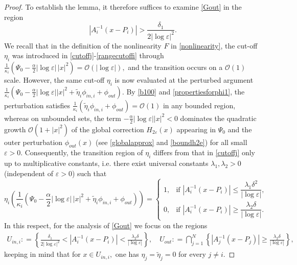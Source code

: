 \documentclass[11pt,reqno,a4paper]{amsart}
\numberwithin{equation}{section}
\newcommand{\defeq}{\mathrel{\mathop:}=}
\newcommand{\ve}{\varepsilon}
\begin{document}
\begin{proof}
To establish the lemma, it therefore suffices to examine \eqref{Gout} in the region \[|A_i^{-1}(x-P_i)|>\frac{\delta_1}{2|\log\ve|^2}.\]  
We recall that in the definition of the nonlinearity $F$ in \eqref{nonlinearity}, the cut-off $\eta_i$ was introduced in \eqref{cutoffj}-\eqref{rangecutoffi} through $\frac{1}{\kappa_i}\left(\Psi_0-\frac{\alpha}{2}|\log\ve|\,|x|^2\right)=\mathcal{O}(|\log\ve|),$ and the transition occurs on a $\mathcal{O}(1)$ scale. However, the same cut-off $\eta_i$ is now evaluated at the perturbed argument $\frac{1}{\kappa_i}(\Psi_0-\frac{\alpha}{2}|\log\ve||x|^2+\tilde{\eta}_i\phi_{in,i}+\phi_{out})$. By \eqref{b100} and \eqref{propertiesforphi1}, the perturbation satisfies
$\frac{1}{\kappa_i}(\tilde{\eta}_i\phi_{in,i}+\phi_{out})=\mathcal{O}(1)$ in any bounded region, whereas on unbounded sets, the term $-\frac{\alpha}{2}|\log\ve||x|^2<0$ dominates the quadratic growth $\mathcal{O}(1+|x|^2)$ of the global correction $H_{2\ve}(x)$ appearing in $\Psi_0$ and the outer perturbation $\phi_{out}(x)$ (see \eqref{globalapprox} and \eqref{boundh2e}) for all small $\ve>0.$ Consequently, the transition region of $\eta_i$ differs from that in \eqref{cutoffj} only up to multiplicative constants, i.e. there exist universal constants $\lambda_1,\lambda_2>0$ (independent of $\ve>0$) such that
\begin{equation*}
\eta_i\left(
\frac{1}{\kappa_i}\left(
\Psi_0-\frac{\alpha}{2}|\log \ve|\,|x|^2+\tilde{\eta}_i\phi_{in,i}+\phi_{out}
\right)\right)
=
\begin{cases}
1, & \text{if } \left|A_i^{-1}(x-P_i)\right| \le \dfrac{\lambda_1\delta^2}{|\log \ve|},\\[1ex]
0, & \text{if } \left|A_i^{-1}(x-P_i)\right| \ge \dfrac{\lambda_2\delta}{|\log \ve|}.
\end{cases}
\end{equation*}
In this respect, for the analysis of \eqref{Gout} we focus on the regions
\begin{equation}\label{Hregions}
\begin{aligned}
U_{in,i}\defeq\left\{\frac{\delta_1}{2|\log\ve|^2} <|A_{i}^{-1}(x-P_i)|<\frac{\lambda_2\delta}{|\log\ve|}\right\},\quad
U_{out}\defeq \bigcap\limits_{j=1}^{N}\left\{|A_j^{-1}(x-P_j)|\geq\frac{\lambda_2\delta}{|\log\ve|}\right\},
\end{aligned}
\end{equation}
keeping in mind that for $x\in U_{in,i},$ one has $\eta_j=\tilde{\eta}_j=0$ for every $j\neq i$. 


\end{proof}
\end{document}
